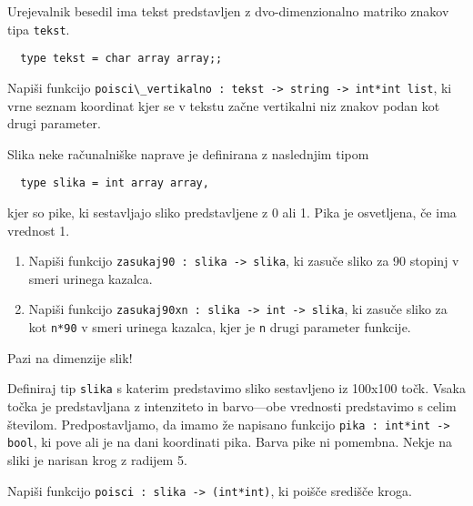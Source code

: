 \begin{ex}
  Urejevalnik besedil ima tekst predstavljen z dvo-dimenzionalno
  matriko znakov tipa \lstinline{tekst}.

  \begin{lstlisting}
  type tekst = char array array;;
  \end{lstlisting}

  Napi\v si funkcijo 
  \lstinline{poisci\_vertikalno : tekst -> string -> int*int list}, 
  ki vrne seznam koordinat kjer se v tekstu za\v cne
  vertikalni niz znakov podan kot drugi parameter.
\end{ex} 



\begin{ex}
  Slika neke ra\v cunalni\v ske naprave je definirana z naslednjim
  tipom

  \begin{lstlisting}
  type slika = int array array,
  \end{lstlisting}
  kjer so pike, ki sestavljajo sliko predstavljene z 0 ali 1. Pika je
  osvetljena, \v ce ima vrednost 1.

  \begin{enumerate}[label=(\roman*)]
  \item Napi\v si funkcijo \lstinline{zasukaj90 : slika -> slika}, ki
    zasu\v ce sliko za 90 stopinj v smeri urinega kazalca.

  \item Napi\v si funkcijo 
  \lstinline{zasukaj90xn : slika -> int -> slika}, 
  ki zasu\v ce sliko za kot \lstinline{n*90} v smeri urinega
    kazalca, kjer je \lstinline{n} drugi parameter funkcije.
  \end{enumerate}

  Pazi na dimenzije slik!
\end{ex} 




\begin{ex}
  Definiraj tip \lstinline{slika} s katerim predstavimo sliko sestavljeno
  iz 100x100 to\v ck. Vsaka to\v cka je predstavljana z intenziteto in
  barvo---obe vrednosti predstavimo s celim \v stevilom.
  Predpostavljamo, da imamo \v ze napisano funkcijo \lstinline{pika : int*int -> bool}, 
  ki pove ali je na dani koordinati pika. Barva
  pike ni pomembna.
  Nekje na sliki je narisan krog z radijem 5. 
  
  \noindent Napi\v si funkcijo
  \lstinline{poisci : slika -> (int*int)}, ki poi\v s\v ce sredi\v s\v ce
  kroga.
\end{ex} 




